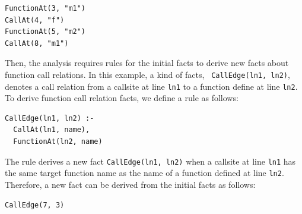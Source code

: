
\begin{lstlisting}
FunctionAt(3, "m1")
CallAt(4, "f")
FunctionAt(5, "m2")
CallAt(8, "m1")
\end{lstlisting}

Then, the analysis requires rules for the initial facts to derive new facts
about function call relations. In this example, a kind of facts, {\tt
CallEdge(ln1, ln2)}, denotes a call relation from a callsite at line {\tt ln1}
to a function define at line {\tt ln2}. To derive function call relation facts,
we define a rule as follows: 


\begin{lstlisting}
CallEdge(ln1, ln2) :-
  CallAt(ln1, name),
  FunctionAt(ln2, name)
\end{lstlisting}


\noindent
The rule derives a new fact {\tt CallEdge(ln1, ln2)} when a callsite at line
{\tt ln1} has the same target function name as the name of a function defined
at line {\tt ln2}. Therefore, a new fact can be derived from the initial facts
as follows: 

\begin{lstlisting}
CallEdge(7, 3)
\end{lstlisting}

